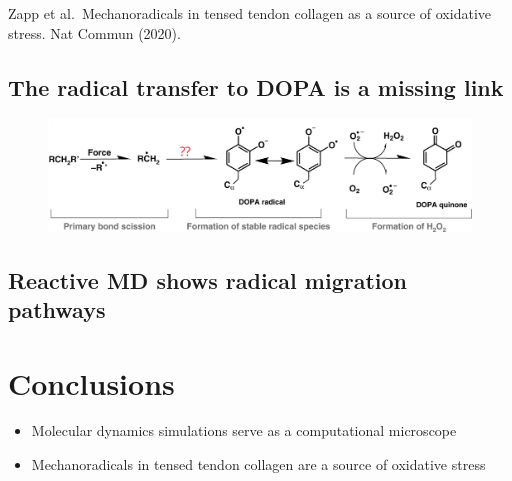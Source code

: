 \documentclass[
  letterpaper,
  DIV=11,
  numbers=noendperiod]{scrartcl}
\providecommand{\tightlist}{%
  \setlength{\itemsep}{0pt}\setlength{\parskip}{0pt}}\usepackage{longtable,booktabs,array}
\begin{document}
Zapp et al.~Mechanoradicals in tensed tendon collagen as a source of
oxidative stress. Nat Commun (2020).

\hypertarget{the-radical-transfer-to-dopa-is-a-missing-link}{%
\subsection{The radical transfer to DOPA is a missing
link}\label{the-radical-transfer-to-dopa-is-a-missing-link}}

\begin{figure}

{\centering \includegraphics{www/Collagen_mechanism.png}

}

\end{figure}

\hypertarget{reactive-md-shows-radical-migration-pathways}{%
\subsection{Reactive MD shows radical migration
pathways}\label{reactive-md-shows-radical-migration-pathways}}

\hypertarget{conclusions}{%
\section{Conclusions}\label{conclusions}}

\begin{itemize}
\tightlist
\item
  Molecular dynamics simulations serve as a computational microscope
\item
  Mechanoradicals in tensed tendon collagen are a source of oxidative
  stress
\end{itemize}

\hypertarget{section-1}{%
\section{}\label{section-1}}
\end{document}
